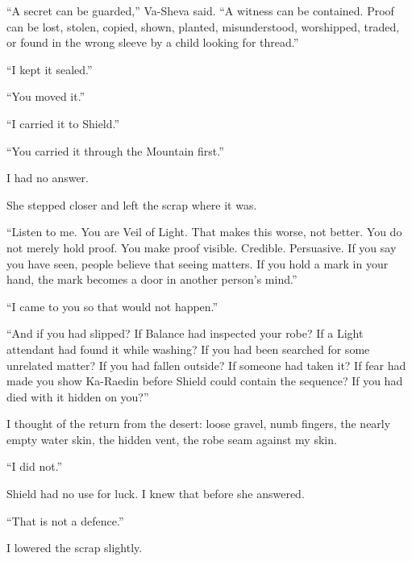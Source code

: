 \ornament

``A secret can be guarded,'' Va-Sheva said. ``A witness can be contained. Proof can be lost, stolen, copied, shown, planted, misunderstood, worshipped, traded, or found in the wrong sleeve by a child looking for thread.''\par

``I kept it sealed.''\par

``You moved it.''\par

``I carried it to Shield.''\par

``You carried it through the Mountain first.''\par

I had no answer.\par

She stepped closer and left the scrap where it was.\par

``Listen to me. You are Veil of Light. That makes this worse, not better. You do not merely hold proof. You make proof visible. Credible. Persuasive. If you say you have seen, people believe that seeing matters. If you hold a mark in your hand, the mark becomes a door in another person's mind.''\par

``I came to you so that would not happen.''\par

``And if you had slipped? If Balance had inspected your robe? If a Light attendant had found it while washing? If you had been searched for some unrelated matter? If you had fallen outside? If someone had taken it? If fear had made you show Ka-Raedin before Shield could contain the sequence? If you had died with it hidden on you?''\par

I thought of the return from the desert: loose gravel, numb fingers, the nearly empty water skin, the hidden vent, the robe seam against my skin.\par

``I did not.''\par

Shield had no use for luck. I knew that before she answered.\par

``That is not a defence.''\par

I lowered the scrap slightly.\par

